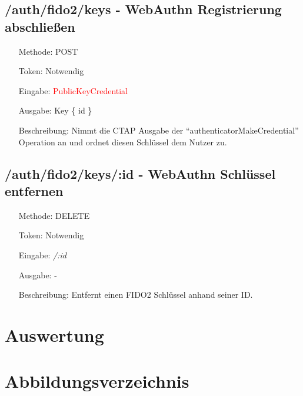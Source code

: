 \documentclass[journal]{IEEEtran}
\begin{document}
\subsection{/auth/fido2/keys - WebAuthn Registrierung abschließen}

\begin{itemize}
	\setlength{\leftskip}{1.5cm}
	\setlength{\itemsep}{0pt}
	\item[Methode:] POST
	\item[Token:] Notwendig
	\item[Eingabe:] \textcolor{red}{PublicKeyCredential}
	\item[Ausgabe:] Key \{ id \}
	\item[Beschreibung:] Nimmt die CTAP Ausgabe der
		``authenticatorMakeCredential'' Operation an und ordnet diesen
		Schlüssel dem Nutzer zu.
\end{itemize}

\subsection{/auth/fido2/keys/:id - WebAuthn Schlüssel entfernen}

\begin{itemize}
	\setlength{\leftskip}{1.5cm}
	\setlength{\itemsep}{0pt}
	\item[Methode:] DELETE
	\item[Token:] Notwendig
	\item[Eingabe:] \textit{/:id}
	\item[Ausgabe:] -
	\item[Beschreibung:] Entfernt einen FIDO2 Schlüssel anhand seiner ID.\@
\end{itemize}

\section{Auswertung}

\section{Abbildungsverzeichnis}



\end{document}
